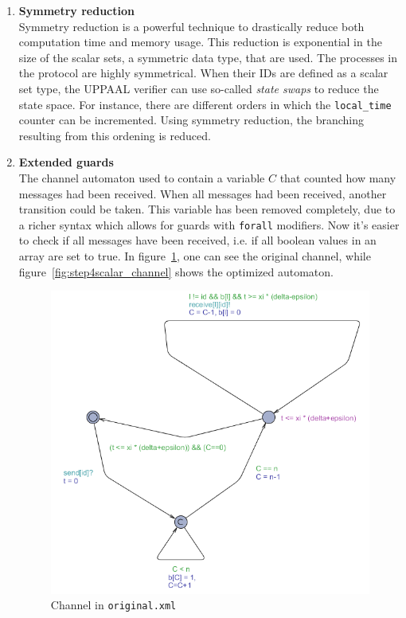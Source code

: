 \documentclass[a4paper,10pt]{article}
\newcommand{\UPPAAL}{UPPAAL\xspace}
\begin{document}
\begin{enumerate}
\item \textbf{Symmetry reduction} \\
	Symmetry reduction \cite{Hendriks2004Adding} is a powerful technique to drastically reduce both computation time and memory usage. This reduction is exponential in the size of the scalar sets, a symmetric data type, that are used. The processes in the protocol are highly symmetrical. When their IDs are defined as a scalar set type, the \UPPAAL verifier can use so-called \textit{state swaps} to reduce the state space. For instance, there are different orders in which the \texttt{local\_time} counter can be incremented. Using symmetry reduction, the branching resulting from this ordening is reduced.

\item \textbf{Extended guards} \\
	The channel automaton used to contain a variable \(C\) that counted how many messages had been received. When all messages had been received, another transition could be taken. This variable has been removed completely, due to a richer syntax which allows for guards with \texttt{forall} modifiers. Now it's easier to check if all messages have been received, i.e. if all boolean values in an array are set to true. In figure~\ref{fig:original_channel}, one can see the original channel, while figure~\ref{fig:step4scalar_channel} shows the optimized automaton.

\begin{figure}[!h]
\includegraphics[scale=0.7]{original_channel}
\caption{Channel in \texttt{original.xml}\label{fig:original_channel}}
\end{figure}


\end{enumerate}
\end{document}
